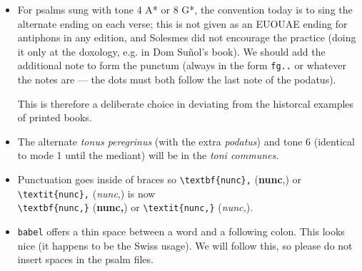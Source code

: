 \documentclass[11pt]{article}
\begin{document}
\begin{itemize}
 \item
For psalms sung with tone 4 A* or 8 G*, the convention today is to sing the alternate ending on each verse; this is not given as an EUOUAE ending for antiphons in any edition, and Solesmes did not encourage the practice (doing it only at the doxology, e.g. in Dom Suñol's book). We should add the additional note to form the punctum (always in the form \texttt{fg..} or whatever the notes are — the dots must both follow the last note of the podatus).

This is therefore a deliberate choice in deviating from the historcal examples of printed books.

 \item
 The alternate \textit{tonus peregrinus} (with the extra \textit{podatus}) and tone 6 (identical to mode 1 until the mediant) will be in the \textit{toni communes.}
 
  \item
 Punctuation goes inside of braces so \verb|\textbf{nunc},| (\textbf{nunc},) or \verb|\textit{nunc},| (\textit{nunc},) is now\\ \verb|\textbf{nunc,}| (\textbf{nunc,}) or \verb|\textit{nunc,}| (\textit{nunc,}).
 
 \item
\verb|babel| offers a thin space between a word and a following colon. This looks nice (it happens to be the Swiss usage). We will follow this, so please do not insert spaces in the psalm files.
 
 \end{itemize}
\end{document}
